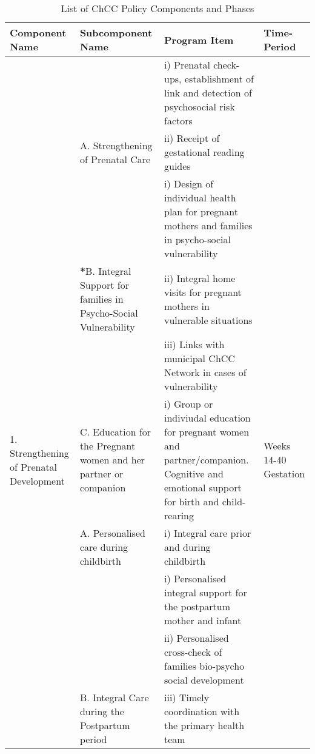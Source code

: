 \documentclass[12pt]{article}
\begin{document}
\begin{spacing}{1.4}
\begin{landscape}
\begin{table}[htpb!]
  \caption{List of ChCC Policy Components and Phases}
  \label{ascn:benefits}
  \begin{tabular}{p{4.5cm}p{5cm}p{10cm}p{2.5cm}}
    \toprule
    Component Name & Subcomponent Name & Program Item & Time-Period\\ \midrule
\cellcolor{dccol}&  \cellcolor{dccol} &\cellcolor{dccol}i) Prenatal check-ups, establishment of link and detection of psychosocial risk factors  &  \cellcolor{dccol} \\
\cellcolor{dccol} & \multirow{-3}{5cm}{\cellcolor{dccol}A. Strengthening of Prenatal Care}        &ii) Receipt of gestational reading guides & \cellcolor{dccol}\\
\cellcolor{dccol} &&\cellcolor{dccol}i) Design of individual health plan for pregnant mothers and families in psycho-social vulnerability&\cellcolor{dccol}\\
\cellcolor{dccol} &\multirow{-2}{5cm}{\textbf{*}B. Integral Support for families in Psycho-Social Vulnerability} &ii) Integral home visits for pregnant mothers in vulnerable situations &\cellcolor{dccol} \\
\cellcolor{dccol} & &\cellcolor{dccol}iii) Links with municipal ChCC Network in cases of vulnerability &\cellcolor{dccol}\\
\multirow{-6}{4.5cm}{\cellcolor{dccol}1. Strengthening of Prenatal Development}                                                        &\cellcolor{dccol} C. Education for the Pregnant women and her partner or companion&i) Group or indiviudal education for pregnant women and partner/companion.  Cognitive and emotional support for birth and child-rearing&\multirow{-6}{2.5cm}{\cellcolor{dccol}Weeks 14-40 Gestation}\\ \midrule %
&\multirow{1}{5cm}{A. Personalised care during childbirth}&\cellcolor{dccol}i) Integral care prior and during childbirth  & \\
&\cellcolor{dccol}    &i) Personalised integral support for the postpartum mother and infant & \\
&\cellcolor{dccol}&\cellcolor{dccol}ii) Personalised cross-check of families bio-psycho social development&\\
&\multirow{-5}{5cm}{\cellcolor{dccol}B. Integral Care during the Postpartum period} &iii) Timely coordination with the primary health team & \\

\end{tabular}
\end{table}
\end{landscape}
\end{spacing}
\end{document}
